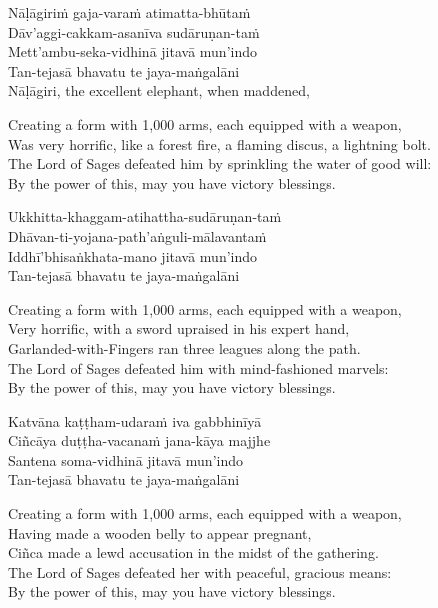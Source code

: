 Nāḷāgiriṁ gaja-varaṁ atimatta-bhūtaṁ\\
Dāv'aggi-cakkam-asanīva sudāruṇan-taṁ\\
Mett'ambu-seka-vidhinā jitavā mun'indo\\
Tan-tejasā bhavatu te jaya-maṅgalāni\\
Nāḷāgiri, the excellent elephant, when maddened,

\begin{english}
  Creating a form with 1,000 arms, each equipped with a weapon,\\
  Was very horrific, like a forest fire, a flaming discus, a lightning bolt.\\
  The Lord of Sages defeated him by sprinkling the water of good will:\\
  By the power of this, may you have victory blessings.
\end{english}

Ukkhitta-khaggam-atihattha-sudāruṇan-taṁ\\
Dhāvan-ti-yojana-path'aṅguli-mālavantaṁ\\
Iddhī'bhisaṅkhata-mano jitavā mun'indo\\
Tan-tejasā bhavatu te jaya-maṅgalāni

\begin{english}
  Creating a form with 1,000 arms, each equipped with a weapon,\\
  Very horrific, with a sword upraised in his expert hand,\\
  Garlanded-with-Fingers ran three leagues along the path.\\
  The Lord of Sages defeated him with mind-fashioned marvels:\\
  By the power of this, may you have victory blessings.
\end{english}

Katvāna kaṭṭham-udaraṁ iva gabbhinīyā\\
Ciñcāya duṭṭha-vacanaṁ jana-kāya majjhe\\
Santena soma-vidhinā jitavā mun'indo\\
Tan-tejasā bhavatu te jaya-maṅgalāni

\begin{english}
  Creating a form with 1,000 arms, each equipped with a weapon,\\
  Having made a wooden belly to appear pregnant,\\
  Ciñca made a lewd accusation in the midst of the gathering.\\
  The Lord of Sages defeated her with peaceful, gracious means:\\
  By the power of this, may you have victory blessings.
\end{english}

